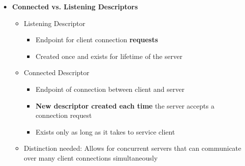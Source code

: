 \documentclass[12pt]{article}
\begin{document}
{\begin{itemize}
\begin{itemize}
\begin{itemize}
			\item Converts \texttt{sockfd} from an active socket to a \textit{listening socket} that can accept connection request from clients
			\item \texttt{backlog} is a hint about the number of outstanding connection requests that the kernel should queue up before it starts to refuse requests
		\end{itemize}
		\item \textbf{\texttt{accept} function} (= receive connection request)
		\begin{itemize}
			\item \texttt{int accept(int listenfd, SA *addr, int *addrlen);}
			\item Server waits for connection requests from clients by calling \texttt{accept}
			\item Waits for connection request to arrive on the connection bound to \texttt{listenfd}, then fills in client's socket address in \texttt{addr} and size of the socket address in \texttt{addrlen}
			\item Returns a \textit{connected descriptor} that can be used to communicate with the client via Unix I/O routines
		\end{itemize}
	\end{itemize}
	\item \textbf{Connected vs. Listening Descriptors}
	\begin{itemize}
		\item Listening Descriptor
		\begin{itemize}
			\item Endpoint for client connection \textbf{requests}
			\item Created once and exists for lifetime of the server
		\end{itemize}
		\item Connected Descriptor
		\begin{itemize}
			\item Endpoint of connection between client and server
			\item \textbf{New descriptor created each time} the server accepts a connection request
			\item Exists only as long as it takes to service client
		\end{itemize}
		\item Distinction needed: Allows for concurrent servers that can communicate over many client connections simultaneously
	\end{itemize}

\end{itemize}}
\end{document}

